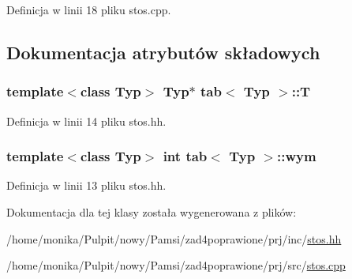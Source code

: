 \-Definicja w linii 18 pliku stos.\-cpp.



\subsection{\-Dokumentacja atrybutów składowych}
\hypertarget{classtab_a97745f07acefb042ad21811141f51afb}{
\subsubsection[{\-T}]{\setlength{\rightskip}{0pt plus 5cm}template$<$class \-Typ$>$ \-Typ$\ast$ {\bf tab}$<$ \-Typ $>$\-::{\bf \-T}}}\label{classtab_a97745f07acefb042ad21811141f51afb}


\-Definicja w linii 14 pliku stos.\-hh.

\hypertarget{classtab_a3bb4a59327034c236f8fe9c0c35b90a7}{
\subsubsection[{wym}]{\setlength{\rightskip}{0pt plus 5cm}template$<$class \-Typ$>$ int {\bf tab}$<$ \-Typ $>$\-::{\bf wym}}}\label{classtab_a3bb4a59327034c236f8fe9c0c35b90a7}


\-Definicja w linii 13 pliku stos.\-hh.



\-Dokumentacja dla tej klasy została wygenerowana z plików\-:\begin{DoxyCompactItemize}
\item 
/home/monika/\-Pulpit/nowy/\-Pamsi/zad4poprawione/prj/inc/\hyperlink{stos_8hh}{stos.\-hh}\item 
/home/monika/\-Pulpit/nowy/\-Pamsi/zad4poprawione/prj/src/\hyperlink{stos_8cpp}{stos.\-cpp}\end{DoxyCompactItemize}
